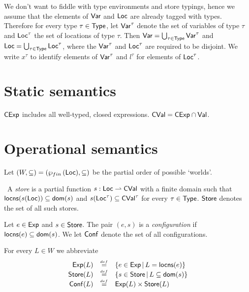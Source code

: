 \documentclass[12pt,a4paper]{article}
\newcommand{\CExp}{\sstyle{CExp}}
\newcommand{\CVal}{\sstyle{CVal}}
\newcommand{\Conf}{\sstyle{Conf}}
\begin{document}
We don't want to fiddle with type environments and store typings, hence we assume that
the elements of $\mathsf{Var}$ and $\mathsf{Loc}$ are already tagged with types. Therefore for every
type $\tau\in\mathsf{Type}$, let $\mathsf{Var}^\tau$ denote the set of variables of type $\tau$ and $\mathsf{Loc}^\tau$ the
set of locations of type $\tau$. Then $\mathsf{Var}=\bigcup_{\tau\in\mathsf{Type}}\mathsf{Var}^\tau$ and
$\mathsf{Loc}=\bigcup_{\tau\in\mathsf{Type}}\mathsf{Loc}^\tau$, where the $\mathsf{Var}^\tau$ and $\mathsf{Loc}^\tau$ are
required to be disjoint. We write $x^\tau$ to identify elements of $\mathsf{Var}^\tau$ and
$l^\tau$ for elements of $\mathsf{Loc}^\tau$.



\section{Static semantics}

$\CExp$ includes all well-typed, closed expressions. $\CVal = \CExp \cap \Val$.



\section{Operational semantics}

Let $(W,\subseteq) = (\wp_{fin}\,(\mathsf{Loc}),\subseteq)$ be the partial order of possible `worlds'.

\begin{definition}[Store] \label{definition:Store} \
  A {\em store} is a partial function $s:\Loc \pto \CVal$
  with a finite domain such that $\mathsf{locns}(s(\mathsf{Loc})) \subseteq \mathsf{dom}(s)$ and
  $s(\Loc^\tau) \subseteq \CVal^\tau$ for every $\tau\in\mathsf{Type}$.
  $\mathsf{Store}$ denotes the set of all such stores.
\end{definition}

\begin{definition}[Configuration]
  Let $e\in\mathsf{Exp}$ and $s\in\mathsf{Store}$. The pair $(e,s)$ is a {\em configuration}
  if $\mathsf{locns}(e) \subseteq \mathsf{dom}(s)$. We let $\Conf$ denote the set of all configurations.
\end{definition}

For every $L\in W$ we abbreviate
\[\begin{array}{rcl}
  \Exp(L) &\defeqn& \{e\in\Exp\,|\,L = \locns{e}\} \\
  \Store(L) &\defeqn& \{s\in\Store\,|\,L \subseteq \dom{s}\} \\
  \Conf(L) &\defeqn& \Exp(L) \times \Store(L)
\end{array}\]
\end{document}
